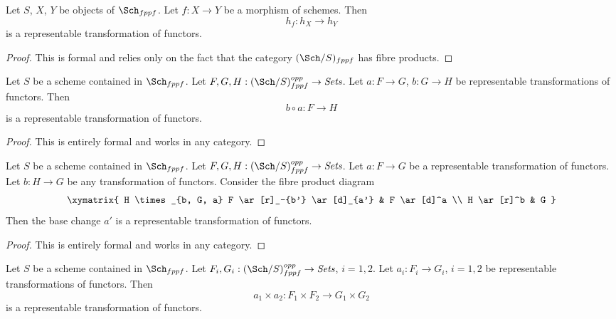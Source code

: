 \begin{lemma}
\label{lemma-morphism-schemes-gives-representable-transformation}
Let $S$, $X$, $Y$ be objects of $\Sch_{fppf}$.
Let $f : X \to Y$ be a morphism of schemes.
Then
$$
h_f : h_X \longrightarrow h_Y
$$
is a representable transformation of functors.
\end{lemma}

\begin{proof}
This is formal and relies only on the fact that
the category $(\Sch/S)_{fppf}$ has fibre products.
\end{proof}

\begin{lemma}
\label{lemma-composition-representable-transformations}
Let $S$ be a scheme contained in $\Sch_{fppf}$.
Let $F, G, H : (\Sch/S)_{fppf}^{opp} \to \textit{Sets}$.
Let $a : F \to G$, $b : G \to H$ be representable transformations of functors.
Then
$$
b \circ a : F \longrightarrow H
$$
is a representable transformation of functors.
\end{lemma}

\begin{proof}
This is entirely formal and works in any category.
\end{proof}

\begin{lemma}
\label{lemma-base-change-representable-transformations}
Let $S$ be a scheme contained in $\Sch_{fppf}$.
Let $F, G, H : (\Sch/S)_{fppf}^{opp} \to \textit{Sets}$.
Let $a : F \to G$ be a representable transformation of functors.
Let $b : H \to G$ be any transformation of functors.
Consider the fibre product diagram
$$
\xymatrix{
H \times_{b, G, a} F \ar[r]_-{b'} \ar[d]_{a'} & F \ar[d]^a \\
H \ar[r]^b & G
}
$$
Then the base change $a'$ is a representable transformation of functors.
\end{lemma}

\begin{proof}
This is entirely formal and works in any category.
\end{proof}

\begin{lemma}
\label{lemma-product-representable-transformations}
Let $S$ be a scheme contained in $\Sch_{fppf}$.
Let $F_i, G_i : (\Sch/S)_{fppf}^{opp} \to \textit{Sets}$, $i = 1, 2$.
Let $a_i : F_i \to G_i$, $i = 1, 2$
be representable transformations of functors.
Then
$$
a_1 \times a_2 : F_1 \times F_2 \longrightarrow G_1 \times G_2
$$
is a representable transformation of functors.
\end{lemma}

